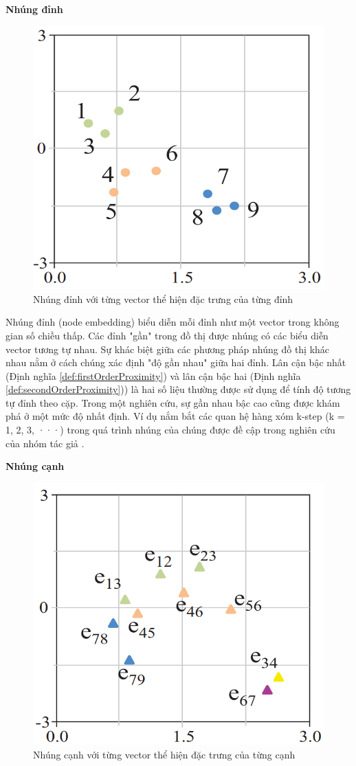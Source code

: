 \textbf{Nhúng đỉnh}
\label{sec:nodeEmbedding}

\begin{figure}[htp]
	\centering
	\includegraphics[width=7 cm]{images/graph_emb_2.png}
	\caption{
		Nhúng đỉnh với từng vector thể hiện đặc trưng của từng đỉnh}
	\label{fig:nodeEmbedding}
\end{figure}

Nhúng đỉnh (node embedding) biểu diễn mỗi đỉnh như một vector trong không gian số chiều thấp. Các đỉnh "gần" trong đồ thị được nhúng có các biểu diễn vector tương tự nhau. Sự khác biệt giữa các phương pháp nhúng đồ thị khác nhau nằm ở cách chúng xác định "độ gần nhau" giữa hai đỉnh. Lân cận bậc nhất (Định nghĩa \ref{def:firstOrderProximity}) và lân cận bậc hai (Định nghĩa \ref{def:secondOrderProximity})) là hai số liệu thường được sử dụng để tính độ tương tự đỉnh theo cặp. Trong một nghiên cứu, sự gần nhau bậc cao cũng được khám phá ở một mức độ nhất định. Ví dụ nắm bắt các quan hệ hàng xóm k-step (k = 1, 2, 3, ···) trong quá trình nhúng của chúng được đề cập trong nghiên cứu của nhóm tác giả \cite{cao2015grarep}.

\textbf{Nhúng cạnh}
\label{sec:edgeEmbedding}

\begin{figure}[htp]
	\centering
	\includegraphics[width=7 cm]{images/graph_emb_3.png}
	\caption{Nhúng cạnh với từng vector thể hiện đặc trưng của từng cạnh}
	\label{fig:edgeEmbedding}
\end{figure}

